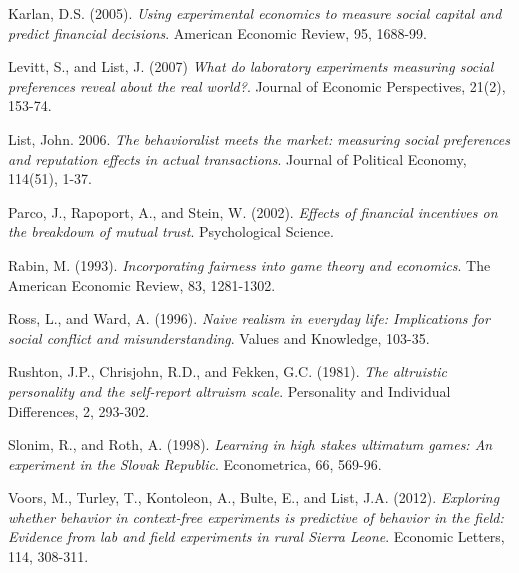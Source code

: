 \documentclass[12pt]{article}
\makeatletter
\let\oldappendix\appendix %
\renewcommand\appendix{%
    \oldappendix
    \newcommand{\section@cntformat}{\appendixname~\thesection\quad}
}
\makeatother
\begin{document}
\begin{thebibliography}{9}
Karlan, D.S. (2005).
\textit{Using experimental economics to measure social capital and predict financial decisions}.
American Economic Review, 95, 1688-99.

Levitt, S., and List, J. (2007)
\textit{What do laboratory experiments measuring social preferences reveal about the real world?}.
Journal of Economic Perspectives, 21(2), 153-74.


List, John. 2006.
\textit{The behavioralist meets the market: measuring social preferences and reputation effects in actual transactions}.
Journal of Political Economy, 114(51), 1-37.


Parco, J., Rapoport, A., and Stein, W. (2002).
\textit{Effects of financial incentives on the breakdown of mutual trust}.
Psychological Science.

Rabin, M. (1993).
\textit{Incorporating fairness into game theory and economics}.
The American Economic Review, 83, 1281-1302.

Ross, L., and Ward, A. (1996).
\textit{Naive realism in everyday life: Implications for social conflict and misunderstanding}.
Values and Knowledge, 103-35.

Rushton, J.P., Chrisjohn, R.D., and Fekken, G.C. (1981).
\textit{The altruistic personality and the self-report altruism scale}.
Personality and Individual Differences, 2, 293-302.

Slonim, R., and Roth, A. (1998).
\textit{Learning in high stakes ultimatum games: An experiment in the Slovak Republic}.
Econometrica, 66, 569-96.


Voors, M., Turley, T., Kontoleon, A., Bulte, E., and List, J.A. (2012).
\textit{Exploring whether behavior in context-free experiments is predictive of behavior in the field: Evidence from lab and field experiments in rural Sierra Leone}.
Economic Letters, 114, 308-311.


\end{thebibliography}

\newpage

\appendix
\end{document}
